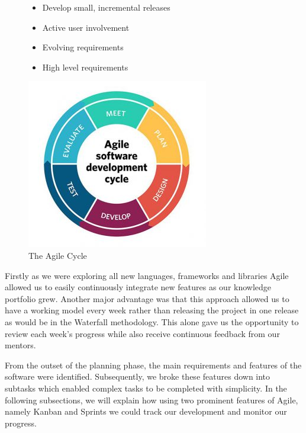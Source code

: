 \begin{figure}[H]
\begin{minipage}{.5\textwidth}  %
\lstset{linewidth = 4cm, breaklines=true} %
\begin{itemize}
\item Develop small, incremental releases
\item Active user involvement
\item Evolving requirements
\item High level requirements
\end{itemize}

\end{minipage}
\qquad %
\begin{minipage}{0.4\textwidth} %
\includegraphics[scale=.4]{img/agile.jpg} %
\caption{The Agile Cycle}
\end{minipage}
\end{figure}

Firstly as we were exploring all new languages, frameworks and libraries Agile allowed us to easily continuously integrate new features as our knowledge portfolio grew. Another major advantage was that this approach allowed us to have a working model every week rather than releasing the project in one release as would be in the Waterfall methodology. This alone gave us the opportunity to review each week's progress while also receive continuous feedback from our mentors.

From the outset of the planning phase, the main requirements and features of the software were identified. Subsequently, we broke these features down into subtasks which enabled complex tasks to be completed with simplicity. In the following subsections, we will explain how using two prominent features of Agile, namely Kanban and Sprints we could track our development and monitor our progress.


